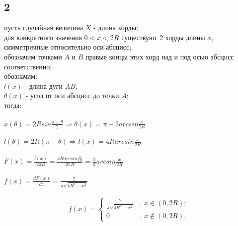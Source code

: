\documentclass[a4paper]{article}
\begin{document}
\begin{large}
		\subsection*{2}
		пусть случайная величина $X$ - длина хорды;\\
		для конкретного значения $0<x<2R$ существуют 2 хорды длины $x$, симметричные относительно оси абсцисс;\\
		обозначим точками $A$ и $B$ правые концы этих хорд над и под осью абсцисс соответственно;\\
		обозначим:\\
		$l(x)$ - длина дуги $AB$;\\
		$\theta(x)$ - угол от оси абсцисс до точки $A$;\\
		тогда:\\
		\\
		$x(\theta)=2Rsin\frac{\pi - \theta}{2} \Rightarrow \theta(x) = \pi - 2arcsin\frac{x}{2R}$\\
		\\
		$l(\theta)=2R(\pi - \theta) \Rightarrow l(x)=4Rarcsin\frac{x}{2R}$\\
		\\
		$F(x) = \frac{l(x)}{2\pi R} = \frac{4Rarcsin\frac{x}{2R}}{2\pi R}=\frac{2}{\pi}arcsin\frac{x}{2R}$\\
		\\
		$f(x) = \frac{dF(x)}{dx}=\frac{2}{\pi \sqrt{4R^2-x^2}}$\\
		\\
		\[ f(x) = \left\{ \begin{array}{ll}
			\frac{2}{\pi \sqrt{4R^2-x^2}} & \mbox{, $x \in (0, 2R)$};\\
			0 & \mbox{, $x \notin (0, 2R)$}.\end{array} \right. \]
	\end{large}
\end{document}
